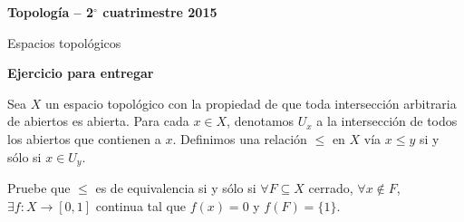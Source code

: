 \documentclass[11pt]{article}
\begin{document}
\pagestyle{empty}
\pagestyle{fancy}
\fancyfoot[CO]{\slshape \thepage}
\renewcommand{\headrulewidth}{0pt}



\centerline{\bf Topolog\'ia -- 2$^\circ$
cuatrimestre 2015}
\centerline{\sc Espacios topol\'ogicos}

\bigskip

\textbf{Ejercicio para entregar}

Sea $X$ un espacio topol\'ogico con la propiedad de que toda intersecci\'on arbitraria de abiertos
 es abierta. Para cada $x\in X$, denotamos
 $U_x$ a la intersecci\'on de todos los abiertos que contienen a $x$. 
 Definimos una relaci\'on $\leq$ en $X$ v\'ia $x\leq y$ si y s\'olo si $x\in U_y$.  
 
 Pruebe que $\leq$ es de equivalencia si y s\'olo si $\forall F\subseteq X$ cerrado, 
 $\forall x\notin F$,
 $\exists f:X\rightarrow [0,1]$ continua tal que $f(x)=0$ y $f(F)=\{1\}$.
\end{document}
